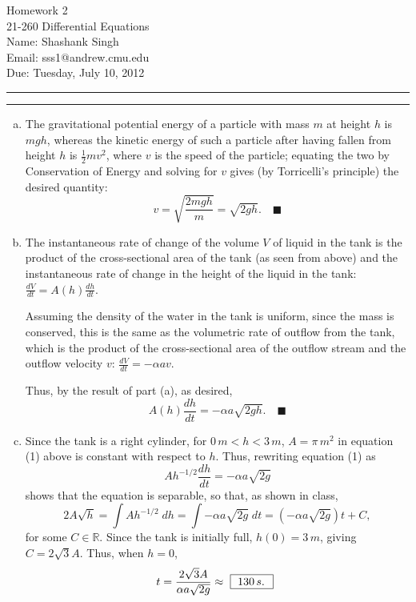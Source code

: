 \documentclass[11pt]{article}
\makeatletter
\newcounter{questionCounter}
\newcounter{partCounter}[questionCounter]
\newenvironment{question}[2][\arabic{questionCounter}]{%
    \setcounter{partCounter}{0}%
    \vspace{.25in} \hrule \vspace{0.5em}%
        \noindent{\bf #2}%
    \vspace{0.8em} \hrule \vspace{.10in}%
    \addtocounter{questionCounter}{1}%
}{}
\newcommand{\myname}{Shashank Singh}
\newcommand{\myandrew}{sss1@andrew.cmu.edu}
\newcommand{\myclass}{21-260 Differential Equations}
\newcommand{\myhwnum}{2}
\newcommand{\duedate}{Tuesday, July 10, 2012}
\newcommand{\mqed}{\quad \blacksquare}
\makeatother
\begin{document}
\thispagestyle{plain}

{\Large Homework \myhwnum} \\
\myclass \\
Name: \myname \\
Email: \myandrew \\
Due: \duedate \\

\begin{question}{Section 2.3, Problem 6}
\begin{enumerate}[(a)]
\item The gravitational potential energy of a particle with mass $m$ at height
$h$ is $mgh$, whereas the kinetic energy of such a particle after having
fallen from height $h$ is $\frac12 mv^2$, where $v$ is the speed of the
particle; equating the two by Conservation of Energy and solving for $v$
gives (by Torricelli's principle) the desired quantity:
\[v = \sqrt{\frac{2mgh}{m}} = \sqrt{2gh}.\mqed\]

\item The instantaneous rate of change of the volume $V$ of liquid in the tank
is the product of the cross-sectional area of the tank (as seen from above)
and the instantaneous rate of change in the height of the liquid in the tank:
$\frac{dV}{dt} = A(h) \frac{dh}{dt}$.

Assuming the density of the water in the tank is uniform, since the mass is
conserved, this is the same as the volumetric rate of outflow from the tank,
which is the product of the cross-sectional area of the outflow stream and the
outflow velocity $v$:
$\frac{dV}{dt} = -\alpha av$.

Thus, by the result of part (a), as desired,
\begin{equation}
A(h) \frac{dh}{dt} = -\alpha a\sqrt{2gh}. \mqed
\end{equation}

\item Since the tank is a right cylinder, for $0\,m < h < 3\,m$,
$A = \pi\,m^2$ in equation (1) above is constant with respect to $h$. Thus,
rewriting equation (1) as
\[Ah^{-1/2} \frac{dh}{dt} = -\alpha a\sqrt{2g}\]
shows that the equation is separable, so that, as shown in class,
\[2A\sqrt{h}
 = \int Ah^{-1/2} \; dh
 = \int -\alpha a\sqrt{2g} \; dt
 = (-\alpha a\sqrt{2g})t + C,
\]
for some $C \in \mathbb{R}$. Since the tank is initially full,
$h(0) = 3 \, m$, giving $C = 2\sqrt{3}A$. Thus, when $h = 0$,
\[t
 =         \frac{2\sqrt{3}A}{\alpha a\sqrt{2g}}
 \approx   \mbox{
               \fbox{
                   $130\,s$.
               }
           }
\]
\end{enumerate}
\end{question}
\end{document}
